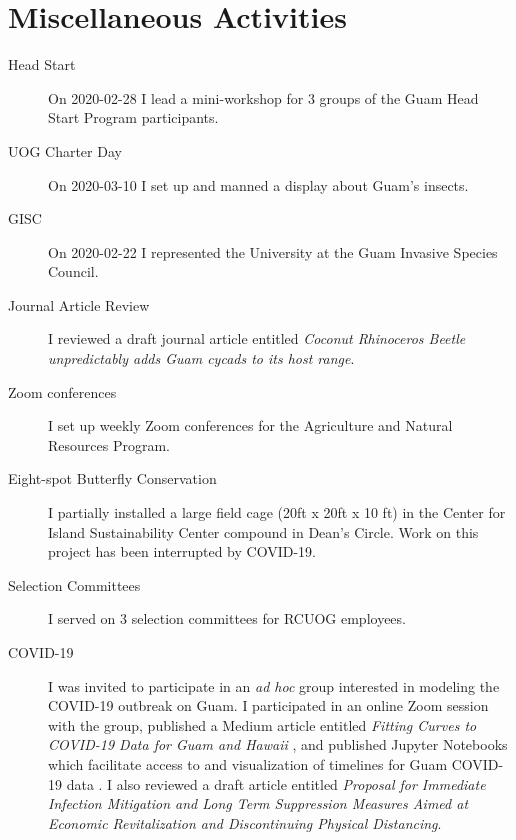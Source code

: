 \section{Miscellaneous Activities}
\begin{refsection}

\begin{description}
	\item[Head Start] On 2020-02-28 I lead a mini-workshop for 3 groups of the Guam Head Start Program participants.
	
	\item[UOG Charter Day] On 2020-03-10 I set up and manned a display about Guam's insects.
	 
	\item[GISC] On 2020-02-22 I represented the University at the Guam Invasive Species Council.
		
	\item[Journal Article Review] I reviewed a draft journal article entitled \textit{Coconut Rhinoceros Beetle unpredictably adds Guam cycads to its host range}.
	
	\item[Zoom conferences] I set up weekly Zoom conferences for the Agriculture and Natural Resources Program.
	
	\item[Eight-spot Butterfly Conservation] I partially installed a large field cage (20ft x 20ft x 10 ft) in the Center for Island Sustainability Center compound in Dean's Circle. Work on this project has been interrupted by COVID-19.
	
	\item[Selection Committees] I served on 3 selection committees for RCUOG employees.
	
	\item[COVID-19] I was invited to participate in an \textit{ad hoc} group interested in modeling the COVID-19 outbreak on Guam.
	I participated in an online Zoom session with the group, published a Medium article entitled \textit{Fitting Curves to COVID-19 Data for Guam and Hawaii} \cite{moore_fitting_2020}, and published Jupyter Notebooks which facilitate access to and visualization of timelines for Guam COVID-19 data \cite{moore_github_2020}. I also reviewed a draft article entitled \textit{Proposal for Immediate Infection Mitigation and Long Term Suppression Measures Aimed at Economic Revitalization and Discontinuing Physical Distancing}.
		
\end{description}
\printbibliography[heading=none]
\end{refsection}



